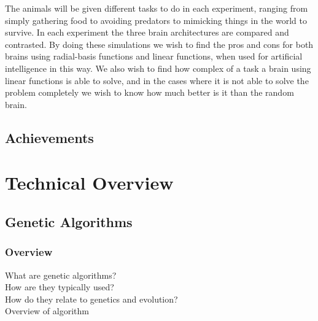 \documentclass[a4paper,11pt]{kth-mag}
\begin{document}
The animals will be given different tasks to do in each experiment, ranging from simply gathering food to avoiding predators to mimicking things in the world to survive. In each experiment the three brain architectures are compared and contrasted. By doing these simulations we wish to find the pros and cons for both brains using radial-basis functions and linear functions, when used for artificial intelligence in this way. We also wish to find how complex of a task a brain using linear functions is able to solve, and in the cases where it is not able to solve the problem completely we wish to know how much better is it than the random brain.


\section{Achievements}

\chapter{Technical Overview}

\section{Genetic Algorithms}

\subsection{Overview}
What are genetic algorithms?\\
How are they typically used?\\
How do they relate to genetics and evolution?\\
Overview of algorithm\\
\end{document}
